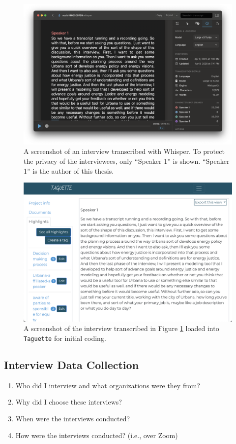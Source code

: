 \begin{figure}
    \centering
    \includegraphics[width=0.6\columnwidth]{figures/07_interview_chapter/whisper-screenshot.png}
    \caption{A screenshot of an interview transcribed with Whisper. To protect
    the privacy of the interviewees, only ``Speaker 1'' is shown. ``Speaker 1''
    is the author of this thesis.}
    \label{fig:whisper}
\end{figure}

\begin{figure}
    \centering
    \includegraphics[width=0.6\columnwidth]{figures/07_interview_chapter/taguette-screenshot}
    \caption{A screenshot of the interview transcribed in Figure \ref{fig:whisper}
    loaded into \texttt{Taguette} for initial coding.}
    \label{fig:taguette}
\end{figure}

\subsection{Interview Data Collection}

\begin{enumerate}
    \item Who did I interview and what organizations were they from?
    \item Why did I choose these interviews?
    \item When were the interviews conducted?
    \item How were the interviews conducted? (i.e., over Zoom)
\end{enumerate}


